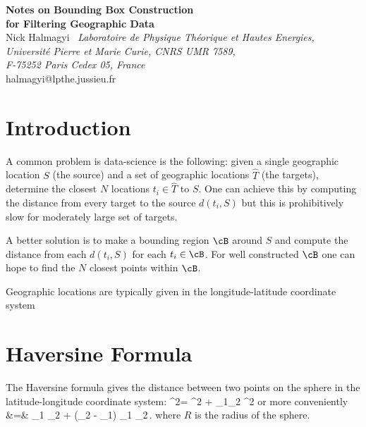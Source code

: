 \documentclass[preprint,12pt]{article}
\begin{document}

\begin{center}
\end{center}

\vspace{0.5cm}
\begin{center}
\baselineskip=13pt {\LARGE \bf{Notes on Bounding Box Construction \\
for Filtering Geographic Data}\\}
 \vskip1.5cm 
Nick Halmagyi\ 
 \vskip0.5cm
\textit{Laboratoire de Physique Th\'eorique et Hautes Energies,\\
Universit\'e Pierre et Marie Curie, CNRS UMR 7589, \\
F-75252 Paris Cedex 05, France}\\
\vskip0.5cm
halmagyi@lpthe.jussieu.fr \\
\end{center}

\section{Introduction}
A common problem is data-science is the following: given a single geographic location $S$ (the  source) and a set of geographic locations $\widehat{T}$ (the targets), determine the closest $N$ locations $t_i \in \widehat{T}$  to $S$. One can achieve this by computing the distance from every target to the source $d(t_i, S)$ but this is prohibitively slow for moderately large set of targets.

A better solution is to make a bounding region $\cB$ around $S$ and compute the distance from each $d(t_i,S)$ for each $t_i \in \cB$. For well constructed $\cB$ one can hope to find the $N$ closest points within $\cB$.


Geographic locations are typically given in the longitude-latitude coordinate system

\section{Haversine Formula}
 
 The Haversine formula gives the distance between two points on the sphere in the latitude-longitude coordinate system: 
 \be
 \sin^2\Blp {}\Brp= \sin^2\Blp {} \Brp+ \cos \vphi_1\cos \vphi_2 \sin^2\Blp {}\Brp
 \ee
 or more conveniently
 \bea
\cos {} &=& \sin \vphi_1 \sin \vphi_2 + \cos (\lam_2 - \lam_1)   \cos \vphi_1 \cos \vphi_2\,.
 \eea
where $R$ is the radius of the sphere.
\end{document}
